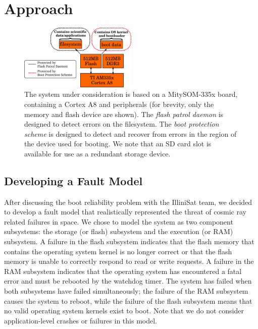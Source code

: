 \section{Approach}\label{sec:approach}

\begin{figure}
  \centering
  \includegraphics[width=0.5\textwidth]{images/block_diagram}
  \caption{The system under consideration is based on a MitySOM-335x
  board, containing a Cortex A8 and peripherals (for brevity, only the memory
  and flash device are shown).  The \textit{flash patrol daemon} is designed to
  detect errors on the filesystem.  The \textit{boot protection scheme} is
  designed to detect and recover from errors in the region of the device used
  for booting.  We note that an SD card slot is available for use as a redundant
  storage device.}\label{fig:block_diagram}
\end{figure}

\subsection{Developing a Fault Model}\label{sec:developingmodel}

After discussing the boot reliability problem with the IlliniSat team, we decided to develop a fault model that realistically represented the threat of cosmic ray related failures in space.  We chose to model the system as two component subsystems: the storage (or flash) subsystem and the execution (or RAM) subsystem.  A failure in the flash subsystem indicates that the flash memory that contains the operating system kernel is no longer correct or that the flash memory is unable to correctly respond to read or write requests.  A failure in the RAM subsystem indicates that the operating system has encountered a fatal error and must be rebooted by the watchdog timer.  The system has failed when both subsystems have failed simultaneously; the failure of the RAM subsystem causes the system to reboot, while the failure of the flash subsystem means that no valid operating system kernels exist to boot.  Note that we do not consider application-level crashes or failures in this model.

